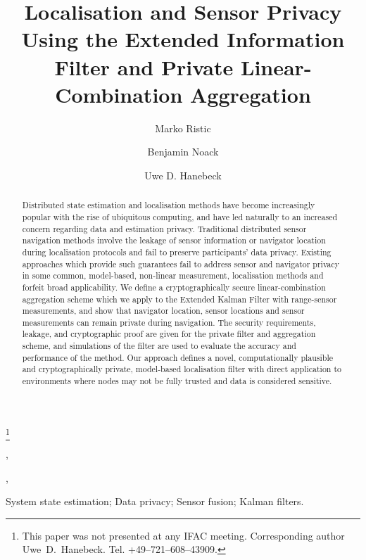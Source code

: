 \documentclass[twocolumn]{autart}
\theoremstyle{definition}
\theoremstyle{remark}
\begin{document}
\begin{frontmatter}

\title{Localisation and Sensor Privacy Using the Extended Information Filter and Private Linear-Combination Aggregation}

\thanks[footnoteinfo]{This paper was not presented at any IFAC 
meeting. Corresponding author Uwe~D.~Hanebeck. Tel. +49--721--608--43909.}

\author[ISAS]{Marko Ristic},
\author[ISAS]{Benjamin Noack},
\author[ISAS]{Uwe D. Hanebeck}

\address[ISAS]{Intelligent Sensor-Actuator-Systems Laboratory, Institute for Anthropomatics, Karlsruhe Institute of Technology, 76131 Karlsruhe, Germany}

\begin{keyword}
System state estimation; Data privacy; Sensor fusion; Kalman filters.
\end{keyword}

\begin{abstract}
Distributed state estimation and localisation methods have become increasingly popular with the rise of ubiquitous computing, and have led naturally to an increased concern regarding data and estimation privacy. Traditional distributed sensor navigation methods involve the leakage of sensor information or navigator location during localisation protocols and fail to preserve participants’ data privacy. Existing approaches which provide such guarantees fail to address sensor and navigator privacy in some common, model-based, non-linear measurement, localisation methods and forfeit broad applicability. We define a cryptographically secure linear-combination aggregation scheme which we apply to the Extended Kalman Filter with range-sensor measurements, and show that navigator location, sensor locations and sensor measurements can remain private during navigation. The security requirements, leakage, and cryptographic proof are given for the private filter and aggregation scheme, and simulations of the filter are used to evaluate the accuracy and performance of the method. Our approach defines a novel, computationally plausible and cryptographically private, model-based localisation filter with direct application to environments where nodes may not be fully trusted and data is considered sensitive.
\end{abstract}

\end{frontmatter}
\end{document}
